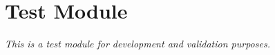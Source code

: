 
\section{Test Module}
\label{sec:test}

\begin{center}
\textit{This is a test module for development and validation purposes.}
\end{center}

